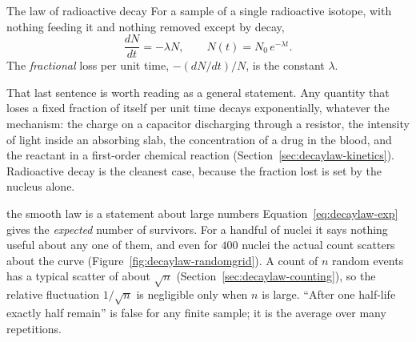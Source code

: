 \begin{keybox}{The law of radioactive decay}
For a sample of a single radioactive isotope, with nothing feeding it and nothing removed except by
decay,
\begin{equation}\label{eq:decaylaw-exp}
\frac{dN}{dt}=-\lambda N,\qquad N(t)=N_0\,e^{-\lambda t}.
\end{equation}
The \emph{fractional} loss per unit time, $-(dN/dt)/N$, is the constant $\lambda$.
\end{keybox}

That last sentence is worth reading as a general statement. Any quantity that loses a fixed fraction of
itself per unit time decays exponentially, whatever the mechanism: the charge on a capacitor
discharging through a resistor, the intensity of light inside an absorbing slab, the concentration of a
drug in the blood, and the reactant in a first-order chemical reaction
(Section~\ref{sec:decaylaw-kinetics}). Radioactive decay is the cleanest case, because the fraction
lost is set by the nucleus alone.


\begin{trapbox}{the smooth law is a statement about large numbers}
Equation~\eqref{eq:decaylaw-exp} gives the \emph{expected} number of survivors. For a handful of nuclei it
says nothing useful about any one of them, and even for $400$ nuclei the actual count scatters about the
curve (Figure~\ref{fig:decaylaw-randomgrid}). A count of $n$ random events has a typical scatter of about
$\sqrt n$ (Section~\ref{sec:decaylaw-counting}), so the relative fluctuation $1/\sqrt n$ is negligible
only when $n$ is large. ``After one half-life exactly half remain'' is false for any finite sample; it is
the average over many repetitions.
\end{trapbox}

